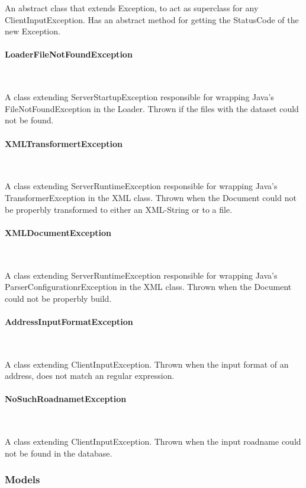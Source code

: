 \documentclass[a4paper,10pt,titlepage]{article}
\begin{document}
An abstract class that extends Exception, to act as superclass for any ClientInputException. Has an abstract method for getting the StatusCode of the new Exception.

				\paragraph{LoaderFileNotFoundException}\mbox{}\

A class extending ServerStartupException responsible for wrapping Java's FileNotFoundException in the Loader. Thrown if the files with the dataset could not be found.

				\paragraph{XMLTransformertException}\mbox{}\

A class extending ServerRuntimeException responsible for wrapping Java's TransformerException in the XML class. Thrown when the Document could not be properbly transformed to either an XML-String or to a file.

				\paragraph{XMLDocumentException}\mbox{}\

A class extending ServerRuntimeException responsible for wrapping Java's ParserConfigurationrException in the XML class. Thrown when the Document could not be properbly build.
				
				\paragraph{AddressInputFormatException}\mbox{}\

A class extending ClientInputException. Thrown when the input format of an address, does not match an regular expression.

				\paragraph{NoSuchRoadnametException}\mbox{}\

A class extending ClientInputException. Thrown when the input roadname could not be found in the database.
				
			\subsubsection{Models}
			
\end{document}
